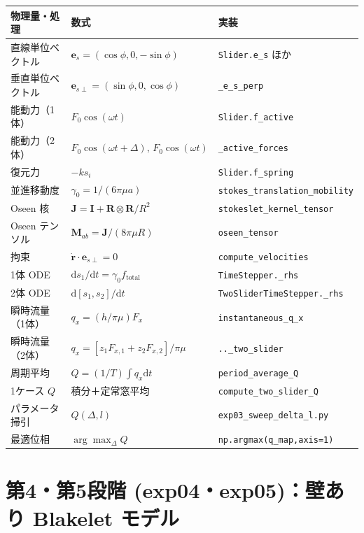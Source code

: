 \documentclass[11pt,a4paper]{article}
\newcommand{\es}{\bm{e}_{s}}
\newcommand{\esp}{\bm{e}_{s\perp}}
\newcommand{\rv}{\bm{r}}
\newcommand{\Mab}{\bm{M}_{ab}}
\newcommand{\gamz}{\gamma_{0}}
\newcommand{\dd}{\mathrm{d}}
\begin{document}
\begin{table}[h]
\centering\small
\renewcommand{\arraystretch}{1.25}
\begin{tabularx}{\linewidth}{X l l}
\toprule
物理量・処理 & 数式 & 実装 \\
\midrule
直線単位ベクトル & $\es=(\cos\phi,0,-\sin\phi)$ &
\texttt{Slider.e\_s} ほか \\
垂直単位ベクトル & $\esp=(\sin\phi,0,\cos\phi)$ &
\texttt{\_e\_s\_perp} \\
能動力（1体） & $F_0\cos(\omega t)$ & \texttt{Slider.f\_active} \\
能動力（2体） & $F_0\cos(\omega t+\Delta),\,F_0\cos(\omega t)$ &
\texttt{\_active\_forces} \\
復元力 & $-k s_i$ & \texttt{Slider.f\_spring} \\
並進移動度 & $\gamz=1/(6\pi\mu a)$ & \texttt{stokes\_translation\_mobility} \\
Oseen 核 & $\bm J=\bm I+\bm R\otimes\bm R/R^2$ &
\texttt{stokeslet\_kernel\_tensor} \\
Oseen テンソル & $\Mab=\bm J/(8\pi\mu R)$ & \texttt{oseen\_tensor} \\
拘束 & $\dot{\rv}\cdot\esp=0$ & \texttt{compute\_velocities} \\
1体 ODE & $\dd s_1/\dd t=\gamz f_{\mathrm{total}}$ & \texttt{TimeStepper.\_rhs} \\
2体 ODE & $\dd[s_1,s_2]/\dd t$ & \texttt{TwoSliderTimeStepper.\_rhs} \\
瞬時流量（1体） & $q_x=(h/\pi\mu)F_x$ & \texttt{instantaneous\_q\_x} \\
瞬時流量（2体） & $q_x=[z_1F_{x,1}+z_2F_{x,2}]/\pi\mu$ &
\texttt{..\_two\_slider} \\
周期平均 & $Q=(1/T)\!\int q_x\dd t$ & \texttt{period\_average\_Q} \\
1ケース $Q$ & 積分＋定常窓平均 & \texttt{compute\_two\_slider\_Q} \\
パラメータ掃引 & $Q(\Delta,l)$ & \texttt{exp03\_sweep\_delta\_l.py} \\
最適位相 & $\arg\max_\Delta Q$ & \texttt{np.argmax(q\_map,axis=1)} \\
\bottomrule
\end{tabularx}
\end{table}

\section{第4・第5段階 (exp04・exp05)：壁あり Blakelet モデル}\label{sec:blakelet}
\end{document}
